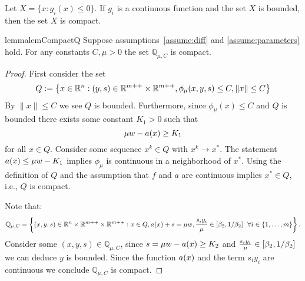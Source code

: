 \documentclass{article}
\begin{document}
\begin{fact}
Let $X = \{ x : g_i(x) \le 0 \}$. If $g_i$ is a continuous function and the set $X$ is bounded, then the set $X$ is compact.
\end{fact}

\begin{restatable}{lemma}{lemCompactQ}\label{lem:compact-Q}
Suppose assumptions~\ref{assume:diff} and \ref{assume:parameters} hold. 
For any constants $C, \mu > 0$ the set $\mathbb{Q}_{\mu, C}$ is compact.
\end{restatable}

\begin{proof}
First consider the set
$$
Q := \left\{ x \in \mathbb{R}^{n} : (y, s) \in \mathbb{R}^{m++} \times \mathbb{R}^{m++}, \phi_{\mu}(x,y,s) \le C, \| x \| \le C \right\} 
$$
By $\| x \| \le C$ we see $Q$ is bounded. Furthermore, since $\phi_{\mu}(x) \le C$ and $Q$ is bounded there exists some constant $K_{1} > 0$ such that
$$
\mu w - a(x) \ge K_{1}
$$
for all $x \in Q$. Consider some sequence $x^{k} \in Q$ with $x^{k} \rightarrow x^{*}$. The statement $a(x) \le \mu w - K_{1}$ implies $\phi_{\mu}$ is continuous in a neighborhood of $x^{*}$. Using the definition of $Q$ and the assumption that $f$ and $a$ are continuous implies $x^{*} \in Q$, i.e., $Q$ is compact. 


Note that:
$$
\mathbb{Q}_{\mu, C} = \left\{ (x,y,s) \in \mathbb{R}^{n} \times \mathbb{R}^{m++} \times \mathbb{R}^{m++} : x \in Q, a(x) + s = \mu w, \frac{s_i y_i}{\mu} \in [\beta_{2}, 1 / \beta_{2}] ~~ \forall i \in \{1 , \dots, m \} \right\}.
$$
Consider some $(x,y,s) \in \mathbb{Q}_{\mu, C}$, since $s = \mu w - a(x) \ge K_{2}$ and $\frac{s_i y_i}{\mu} \in [\beta_{2}, 1 / \beta_{2}]$ we can deduce $y$ is bounded. Since the function $a(x)$ and the term $s_i y_i$ are continuous we conclude $\mathbb{Q}_{\mu, C}$ is compact.
\end{proof}
\end{document}
